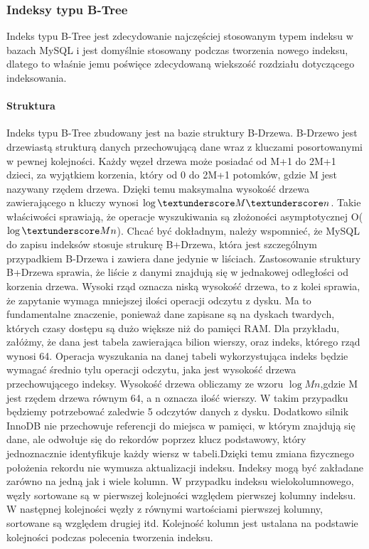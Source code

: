 \subsubsection{Indeksy typu B-Tree}
Indeks typu B-Tree jest zdecydowanie najczęściej stosowanym typem indeksu w bazach MySQL i jest domyślnie stosowany podczas tworzenia nowego indeksu, dlatego to właśnie jemu poświęce zdecydowaną wiekszość rozdziału dotyczącego indeksowania.

\paragraph{Struktura}\mbox{}

Indeks typu B-Tree zbudowany jest na bazie struktury B-Drzewa. B-Drzewo jest drzewiastą strukturą danych przechowującą dane wraz z kluczami posortowanymi w pewnej kolejności. Każdy węzeł drzewa może posiadać od M+1 do 2M+1 dzieci, za wyjątkiem korzenia, który od 0 do 2M+1 potomków, gdzie M jest nazywany rzędem drzewa. Dzięki temu maksymalna wysokość drzewa zawierającego n kluczy wynosi $\log\textunderscore M\textunderscore n$. Takie właściwości sprawiają, że operacje wyszukiwania są złożoności asymptotycznej O($\log\textunderscore M n$). Chcać być dokładnym, należy wspomnieć, że MySQL do zapisu indeksów stosuje strukurę B+Drzewa, która jest szczególnym przypadkiem B-Drzewa i zawiera dane jedynie w liściach.
Zastosowanie struktury B+Drzewa sprawia, że liście z danymi znajdują się w jednakowej odległości od korzenia drzewa. Wysoki rząd oznacza niską wysokość drzewa, to z kolei sprawia, że zapytanie wymaga mniejszej ilości operacji odczytu z dysku. Ma to fundamentalne znaczenie, ponieważ dane zapisane są na dyskach twardych, których czasy dostępu są dużo większe niż do pamięci RAM. Dla przykładu, załóżmy, że dana jest tabela zawierająca bilion wierszy, oraz indeks, którego rząd wynosi 64. Operacja wyszukania na danej tabeli wykorzystująca indeks będzie wymagać średnio tylu operacji odczytu, jaka jest wysokość drzewa przechowującego indeksy. Wysokość drzewa obliczamy ze wzoru $\log M n$,gdzie M jest rzędem drzewa równym 64, a n oznacza ilość wierszy. W takim przypadku będziemy potrzebować zaledwie 5 odczytów danych z dysku. Dodatkowo silnik InnoDB nie przechowuje referencji do miejsca w pamięci, w którym znajdują się dane, ale odwołuje się do rekordów poprzez klucz podstawowy, który jednoznacznie identyfikuje każdy wiersz w tabeli.Dzięki temu zmiana fizycznego położenia rekordu nie wymusza aktualizacji indeksu. Indeksy mogą być zakładane zarówno na jedną jak i wiele kolumn. W przypadku indeksu wielokolumnowego, węzły sortowane są w pierwszej kolejności względem pierwszej kolumny indeksu. W następnej kolejności węzły z równymi wartościami pierwszej kolumny, sortowane są względem drugiej itd. Kolejność kolumn jest ustalana na podstawie kolejności podczas polecenia tworzenia indeksu.

